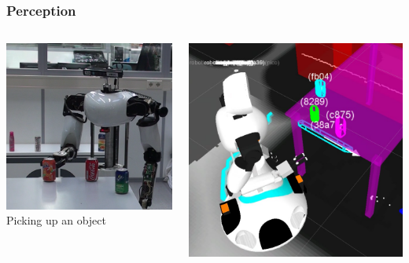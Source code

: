 \documentclass[t]{beamer}
\begin{document}
\begin{frame}
	\frametitle{Perception}
	\begin{columns}
		\begin{column}{0.33\textwidth}
			\begin{center}
				\includegraphics[width=1\linewidth]{Figures/pickup_object}\\
				Picking up an object
			\end{center}
		\end{column}
		\begin{column}{0.33\textwidth}
			\begin{center}
				\includegraphics[width=1\linewidth]{Figures/pickup_object_world_model}\\

\end{center}
\end{column}
\end{columns}
\end{frame}
\end{document}
